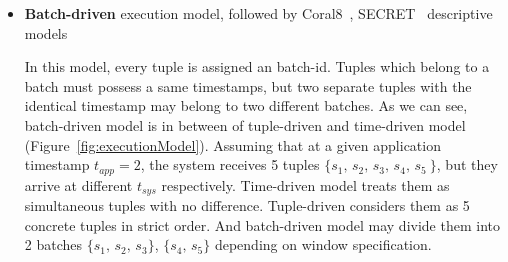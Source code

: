 \begin{itemize}
	\item \textbf{Batch-driven} execution model, followed by Coral8~\citep{Coral8}, SECRET~\citep{Botan:2010} descriptive models 
	
	
In this model, every tuple is assigned an batch-id. Tuples which belong to a batch must possess a same timestamps, but two separate tuples with the identical timestamp may belong to two different batches. As we can see, batch-driven model is in between of tuple-driven and time-driven model (Figure~\ref{fig:executionModel}). Assuming that at a given application timestamp $t_{app} = 2$, the system receives 5 tuples $\{s_1,\,s_2,\,s_3,\,s_4,\,s_5\>\}$,  but they arrive at different $t_{sys}$ respectively. Time-driven model treats them as simultaneous tuples with no difference. Tuple-driven considers them as 5 concrete tuples in strict order. And batch-driven model may divide them into 2 batches $\{s_1,\,s_2,\,s_3\}$, $\{s_4,\,s_5\}$ depending on window specification.




\end{itemize}
